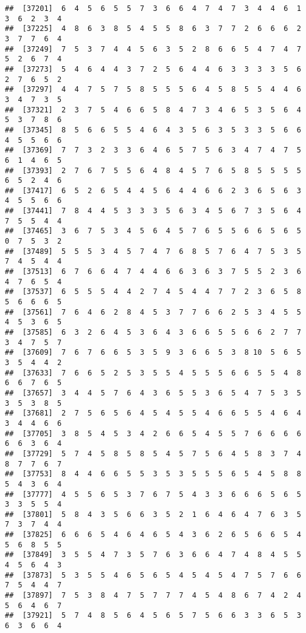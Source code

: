 \documentclass[
]{book}
\begin{document}
\begin{verbatim}
##  [37201]  6  4  5  6  5  5  7  3  6  6  4  7  4  7  3  4  4  6  1  3  6  2  3  4
##  [37225]  4  8  6  3  8  5  4  5  5  8  6  3  7  7  2  6  6  6  2  3  7  7  6  4
##  [37249]  7  5  3  7  4  4  5  6  3  5  2  8  6  6  5  4  7  4  7  5  2  6  7  4
##  [37273]  5  4  6  4  4  3  7  2  5  6  4  4  6  3  3  3  3  5  6  2  7  6  5  2
##  [37297]  4  4  7  5  7  5  8  5  5  5  6  4  5  8  5  5  4  4  6  3  4  7  3  5
##  [37321]  2  3  7  5  4  6  6  5  8  4  7  3  4  6  5  3  5  6  4  5  3  7  8  6
##  [37345]  8  5  6  6  5  5  4  6  4  3  5  6  3  5  3  3  5  6  6  4  5  5  6  6
##  [37369]  7  7  3  2  3  3  6  4  6  5  7  5  6  3  4  7  4  7  5  6  1  4  6  5
##  [37393]  2  7  6  7  5  5  6  4  8  4  5  7  6  5  8  5  5  5  5  6  5  2  4  6
##  [37417]  6  5  2  6  5  4  4  5  6  4  4  6  6  2  3  6  5  6  3  4  5  5  6  6
##  [37441]  7  8  4  4  5  3  3  3  5  6  3  4  5  6  7  3  5  6  4  7  5  5  4  4
##  [37465]  3  6  7  5  3  4  5  6  4  5  7  6  5  5  6  6  5  6  5  0  7  5  3  2
##  [37489]  5  5  5  3  4  5  7  4  7  6  8  5  7  6  4  7  5  3  5  7  4  5  4  4
##  [37513]  6  7  6  6  4  7  4  4  6  6  3  6  3  7  5  5  2  3  6  4  7  6  5  4
##  [37537]  6  5  5  5  4  4  2  7  4  5  4  4  7  7  2  3  6  5  8  5  6  6  6  5
##  [37561]  7  6  4  6  2  8  4  5  3  7  7  6  6  2  5  3  4  5  5  4  5  3  6  5
##  [37585]  6  3  2  6  4  5  3  6  4  3  6  6  5  5  6  6  2  7  7  3  4  7  5  7
##  [37609]  7  6  7  6  6  5  3  5  9  3  6  6  5  3  8 10  5  6  5  3  5  4  4  2
##  [37633]  7  6  6  5  2  5  3  5  5  4  5  5  5  6  6  5  5  4  8  6  6  7  6  5
##  [37657]  3  4  4  5  7  6  4  3  6  5  5  3  6  5  4  7  5  3  5  3  5  3  8  5
##  [37681]  2  7  5  6  5  6  4  5  4  5  5  4  6  6  5  5  4  6  4  3  4  4  6  6
##  [37705]  3  8  5  4  5  3  4  2  6  6  5  4  5  5  7  6  6  6  6  6  6  3  6  4
##  [37729]  5  7  4  5  8  5  8  5  4  5  7  5  6  4  5  8  3  7  4  8  7  7  6  7
##  [37753]  8  4  4  6  6  5  5  3  5  3  5  5  5  6  5  4  5  8  8  5  4  3  6  4
##  [37777]  4  5  5  6  5  3  7  6  7  5  4  3  3  6  6  6  5  6  5  3  3  5  5  4
##  [37801]  5  8  4  3  5  6  6  3  5  2  1  6  4  6  4  7  6  3  5  7  3  7  4  4
##  [37825]  6  6  6  5  4  6  4  6  5  4  3  6  2  6  5  6  6  5  4  5  6  8  5  5
##  [37849]  3  5  5  4  7  3  5  7  6  3  6  6  4  7  4  8  4  5  5  4  5  6  4  3
##  [37873]  5  3  5  5  4  6  5  6  5  4  5  4  5  4  7  5  7  6  6  7  5  4  4  7
##  [37897]  7  5  3  8  4  7  5  7  7  7  4  5  4  8  6  7  4  2  4  5  6  4  6  7
##  [37921]  5  7  4  8  5  6  4  5  6  5  7  5  6  6  3  3  6  5  3  6  3  6  6  4

\end{verbatim}
\end{document}
